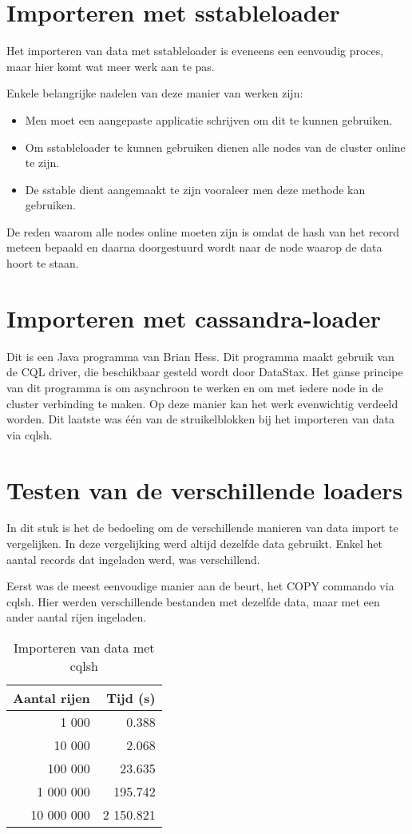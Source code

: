 \section{Importeren met sstableloader}

Het importeren van data met sstableloader is eveneens een eenvoudig proces, maar hier komt wat meer werk aan te pas.

Enkele belangrijke nadelen van deze manier van werken zijn:
\begin{itemize}
	\item Men moet een aangepaste applicatie schrijven om dit te kunnen gebruiken.
	\item Om sstableloader te kunnen gebruiken dienen alle nodes van de cluster online te zijn.
	\item De sstable dient aangemaakt te zijn vooraleer men deze methode kan gebruiken.
\end{itemize}

De reden waarom alle nodes online moeten zijn is omdat de hash van het record meteen bepaald en daarna doorgestuurd wordt naar de node waarop de data hoort te staan.

\section{Importeren met cassandra-loader}
Dit is een Java programma van Brian Hess.
Dit programma maakt gebruik van de CQL driver, die beschikbaar gesteld wordt door DataStax.
Het ganse principe van dit programma is om asynchroon te werken en om met iedere node in de cluster verbinding te maken.
Op deze manier kan het werk evenwichtig verdeeld worden.
Dit laatste was één van de struikelblokken bij het importeren van data via cqlsh.

\section{Testen van de verschillende loaders}
In dit stuk is het de bedoeling om de verschillende manieren van data import te vergelijken.
In deze vergelijking werd altijd dezelfde data gebruikt.
Enkel het aantal records dat ingeladen werd, was verschillend.

Eerst was de meest eenvoudige manier aan de beurt, het COPY commando via cqlsh.
Hier werden verschillende bestanden met dezelfde data, maar met een ander aantal rijen ingeladen.

\begin{table}[H]
	\centering
	\begin{tabular}{|r|r|}
		\hline
		Aantal rijen & Tijd (s) \\
		\hline
		\hline
		1 000 & 0.388 \\
		\hline
		10 000 & 2.068 \\
		\hline
		100 000 & 23.635 \\
		\hline
		1 000 000 & 195.742 \\
		\hline
		10 000 000 & 2 150.821\\
		\hline
	\end{tabular}
	\caption{Importeren van data met cqlsh}
	\label{tab:cas_cqlsh}
\end{table}

